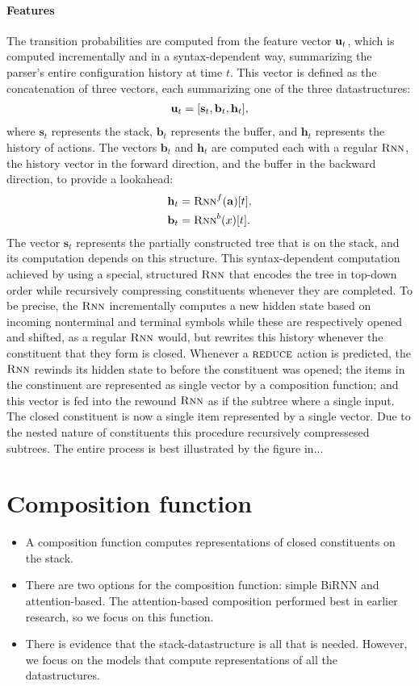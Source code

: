 \subsection{Features}
The transition probabilities are computed from the feature vector $\mathbf{u}_t$, which is computed incrementally and in a syntax-dependent way, summarizing the parser's entire configuration history at time $t$. This vector is defined as the concatenation of three vectors, each summarizing one of the three datastructures:
\begin{align*}
  \mathbf{u}_t = [\mathbf{s}_t, \mathbf{b}_t, \mathbf{h}_t],
\end{align*}
where $\mathbf{s}_t$ represents the stack, $\mathbf{b}_t$ represents the buffer, and $\mathbf{h}_t$ represents the history of actions. The vectors $\mathbf{b}_t$ and $\mathbf{h}_t$ are computed each with a regular $\textsc{Rnn}$, the history vector in the forward direction, and the buffer in the backward direction, to provide a lookahead:
\begin{align*}
  \mathbf{h}_t &= \textsc{Rnn}^{f}( \mathbf{a} )[t],  \\
  \mathbf{b}_t &= \textsc{Rnn}^{b}( x )[t].  \\
\end{align*}
The vector $\mathbf{s}_t$ represents the partially constructed tree that is on the stack, and its computation depends on this structure. This syntax-dependent computation achieved by using a special, structured $\textsc{Rnn}$ that encodes the tree in top-down order while recursively compressing constituents whenever they are completed. To be precise, the $\textsc{Rnn}$ incrementally computes a new hidden state based on incoming nonterminal and terminal symbols while these are respectively opened and shifted, as a regular $\textsc{Rnn}$ would, but rewrites this history whenever the constituent that they form is closed. Whenever a $\textsc{reduce}$ action is predicted, the $\textsc{Rnn}$ rewinds its hidden state to before the constituent was opened; the items in the constinuent are represented as single vector by a composition function; and this vector is fed into the rewound $\textsc{Rnn}$ as if the subtree where a single input. The closed constituent is now a single item represented by a single vector. Due to the nested nature of constituents this procedure recursively compressesed subtrees. The entire process is best illustrated by the figure in...

\part{Composition function}
\begin{itemize}
  \item A composition function computes representations of closed constituents on the stack.
  \item There are two options for the composition function: simple BiRNN and attention-based. The attention-based composition performed best in earlier research, so we focus on this function.
  \item There is evidence that the stack-datastructure is all that is needed. However, we focus on the models that compute representations of all the datastructures.
\end{itemize}

